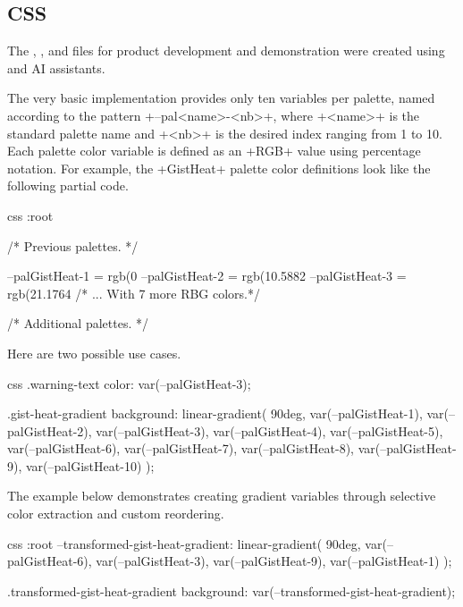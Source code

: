 \documentclass{tutodoc}
\begin{document}

\subsection{CSS}
\label{products-css}

\begin{tdocnote}
The {\html}, {\css}, and {\javascript} files for product development and demonstration were created using {\claudeAI} and {\geminiAI} AI assistants.
\end{tdocnote}

The very basic {\css} implementation provides only ten variables per palette, named according to the pattern +--pal<name>-<nb>+, where +<name>+ is the standard palette name and +<nb>+ is the desired index ranging from 1 to 10. Each palette color variable is defined as an +RGB+ value using percentage notation. For example, the +GistHeat+ palette color definitions look like the following partial code.

\begin{tdoccode}{css}
:root {
  /* Previous palettes. */

  --palGistHeat-1 = rgb(0%
  --palGistHeat-2 = rgb(10.5882%
  --palGistHeat-3 = rgb(21.1764%
  /* ... With 7 more RBG colors.*/

  /* Additional palettes. */
}
\end{tdoccode}

Here are two possible use cases.

\begin{tdoccode}{css}
.warning-text {
  color: var(--palGistHeat-3);
}

.gist-heat-gradient {
  background: linear-gradient(
    90deg,
    var(--palGistHeat-1),
    var(--palGistHeat-2),
    var(--palGistHeat-3),
    var(--palGistHeat-4),
    var(--palGistHeat-5),
    var(--palGistHeat-6),
    var(--palGistHeat-7),
    var(--palGistHeat-8),
    var(--palGistHeat-9),
    var(--palGistHeat-10)
  );
}
\end{tdoccode}

The example below demonstrates creating gradient variables through selective color extraction and custom reordering.

\begin{tdoccode}{css}
:root {
  --transformed-gist-heat-gradient: linear-gradient(
    90deg,
    var(--palGistHeat-6),
    var(--palGistHeat-3),
    var(--palGistHeat-9),
    var(--palGistHeat-1)
  );
}

.transformed-gist-heat-gradient {
  background: var(--transformed-gist-heat-gradient);
}
\end{tdoccode}

\end{document}
